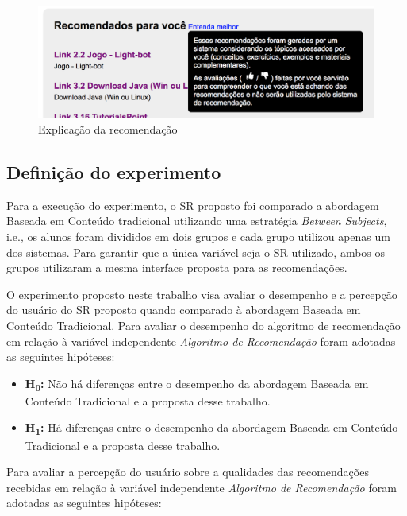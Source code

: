 \begin{figure}[htb]
  \caption{\label{fig:adaptweb-proposta-explicacao}Explicação da recomendação}
  \begin{center}
      \includegraphics[scale=0.6]{./Figuras/explicacao-das-recomendacoes.png}
  \end{center}
\end{figure}

\subsection{Definição do experimento}\label{subsection:definicao-experimento}

Para a execução do experimento, o SR proposto foi comparado a abordagem Baseada em Conteúdo tradicional utilizando uma
estratégia \textit{Between Subjects}, i.e., os alunos foram divididos em dois grupos e cada grupo utilizou apenas
um dos sistemas. Para garantir que a única variável seja o SR utilizado, ambos os grupos utilizaram a mesma
interface proposta para as recomendações.

O experimento proposto neste trabalho visa avaliar o desempenho e a percepção do usuário do SR proposto quando
comparado à abordagem Baseada em Conteúdo Tradicional. Para avaliar o desempenho do algoritmo de recomendação em relação
à variável independente \textit{Algoritmo de Recomendação} foram adotadas as seguintes hipóteses:

\begin{itemize}
\item \textbf{H\textsubscript{0}:} Não há diferenças entre o desempenho da abordagem Baseada em Conteúdo
Tradicional e a proposta desse trabalho.
\item \textbf{H\textsubscript{1}:} Há diferenças entre o desempenho da abordagem Baseada em Conteúdo
Tradicional e a proposta desse trabalho.
\end{itemize}

Para avaliar a percepção do usuário sobre a qualidades das recomendações recebidas em relação
à variável independente \textit{Algoritmo de Recomendação} foram adotadas as seguintes hipóteses:


